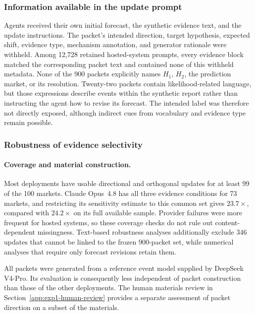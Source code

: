 \subsubsection{Information available in the update prompt}
\label{app:exp1-withholding}

Agents received their own initial forecast, the synthetic evidence text, and the update instructions.
The packet's intended direction, target hypothesis, expected shift, evidence type, mechanism annotation, and generator rationale were withheld.
Among 12,728 retained hosted-system prompts, every evidence block matched the corresponding packet text and contained none of this withheld metadata.
None of the 900 packets explicitly names $H_1$, $H_2$, the prediction market, or its resolution.
Twenty-two packets contain likelihood-related language, but those expressions describe events within the synthetic report rather than instructing the agent how to revise its forecast.
The intended label was therefore not directly exposed, although indirect cues from vocabulary and evidence type remain possible.

\subsubsection{Robustness of evidence selectivity}
\label{app:exp1-alternatives}

\paragraph{Coverage and material construction.}

Most deployments have usable directional and orthogonal updates for at least 99 of the 100 markets.
Claude Opus~4.8 has all three evidence conditions for 73 markets, and restricting its sensitivity estimate to this common set gives $23.7\times$, compared with $24.2\times$ on its full available sample.
Provider failures were more frequent for hosted systems, so these coverage checks do not rule out content-dependent missingness.
Text-based robustness analyses additionally exclude 346 updates that cannot be linked to the frozen 900-packet set, while numerical analyses that require only forecast revisions retain them.

All packets were generated from a reference event model supplied by DeepSeek V4-Pro.
Its evaluation is consequently less independent of packet construction than those of the other deployments.
The human materials review in Section~\ref{app:exp1-human-review} provides a separate assessment of packet direction on a subset of the materials.

